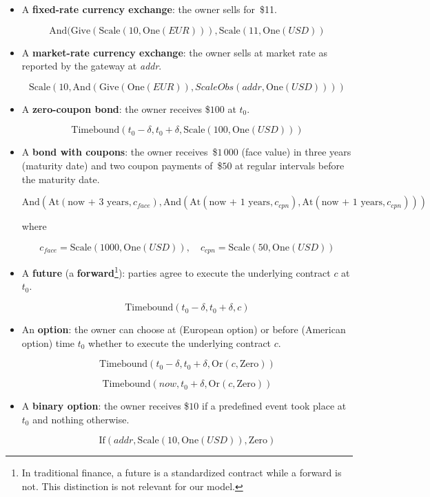 \begin{itemize}
	\item A \textbf{fixed-rate currency exchange}: the owner sells  for~\$11.
	
	\[\mathrm{And}(\mathrm{Give}(\mathrm{Scale}(10, \mathrm{One}(EUR))),\mathrm{Scale}(11,\mathrm{One}(USD))\]
	
	
	\item A \textbf{market-rate currency exchange}: the owner sells  at market rate as reported by the gateway at \textit{addr}.
	
	\[\mathrm{Scale}(10, \mathrm{And}(\mathrm{Give}(\mathrm{One}(EUR)), ScaleObs(addr,\mathrm{One}(USD))))\]
	
	
	\item A \textbf{zero-coupon bond}: the owner receives \$$100$ at \(t_0\).
	
	\[\mathrm{Timebound}(t_0-\delta, t_0+\delta, \mathrm{Scale}(100, \mathrm{One}(USD)))\]
	
	
	\item A \textbf{bond with coupons}: the owner receives~\$$1\,000$ (face value) in three years (maturity date) and two coupon payments of~\$$50$ at regular intervals before the maturity date.
	
	\[\mathrm{And}(\mathrm{At}(\text{now + 3 years},c_{face}),\mathrm{And}(\mathrm{At}(\text{now + 1 years}, c_{cpn}),\mathrm{At}(\text{now + 1 years},c_{cpn})))\]
	
	where
	
	\[c_{face} = \mathrm{Scale}(1000,\mathrm{One}(USD)), \quad c_{cpn} = \mathrm{Scale}(50,\mathrm{One}(USD))\]
	
	
	\item A \textbf{future} (a \textbf{forward}\footnote{In traditional finance, a future is a standardized contract while a forward is not. This distinction is not relevant for our model.}): parties agree to execute the underlying contract \(c\) at \(t_0\).
	
	\[\mathrm{Timebound}(t_0-\delta, t_0+\delta, c)\]
	
	
	\item An \textbf{option}: the owner can choose at (European option) or before (American option) time \(t_0\) whether to execute the underlying contract \(c\).
	
	\[\mathrm{Timebound}(t_0-\delta, t_0+\delta, \mathrm{Or}(c, \mathrm{Zero}))\]
	
	\[\mathrm{Timebound}(now, t_0+\delta, \mathrm{Or}(c, \mathrm{Zero}))\]
	
	
	\item A \textbf{binary option}: the owner receives \$$10$ if a predefined event took place at \(t_0\) and nothing otherwise.
	
	\[\mathrm{If}(addr, \mathrm{Scale}(10, \mathrm{One}(USD)), \mathrm{Zero})\]
	
\end{itemize}
